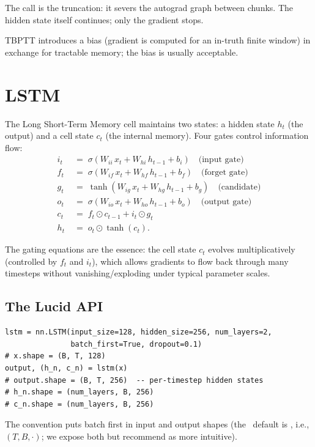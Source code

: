 The  call is the truncation: it severs the
autograd graph between chunks. The hidden state itself
continues; only the gradient stops.

TBPTT introduces a bias (gradient is computed for an in-truth
finite window) in exchange for tractable memory; the bias is
usually acceptable.

\section{LSTM}
\label{sec:rnn_family:lstm}

The Long Short-Term Memory cell maintains two states: a hidden
state $h_t$ (the output) and a cell state $c_t$ (the internal
memory). Four gates control information flow:
\begin{align*}
i_t &\;=\; \sigma(W_{ii}\, x_t + W_{hi}\, h_{t-1} + b_i)
   \quad\text{(input gate)} \\
f_t &\;=\; \sigma(W_{if}\, x_t + W_{hf}\, h_{t-1} + b_f)
   \quad\text{(forget gate)} \\
g_t &\;=\; \tanh(W_{ig}\, x_t + W_{hg}\, h_{t-1} + b_g)
   \quad\text{(candidate)} \\
o_t &\;=\; \sigma(W_{io}\, x_t + W_{ho}\, h_{t-1} + b_o)
   \quad\text{(output gate)} \\
c_t &\;=\; f_t \odot c_{t-1} + i_t \odot g_t \\
h_t &\;=\; o_t \odot \tanh(c_t).
\end{align*}

The gating equations are the essence: the cell state $c_t$ evolves
multiplicatively (controlled by $f_t$ and $i_t$), which allows
gradients to flow back through many timesteps without
vanishing/exploding under typical parameter scales.

\subsection{The Lucid API}
\label{ssec:rnn_family:lstm_api}

\begin{lstlisting}[style=lucid,language=LucidPython]
lstm = nn.LSTM(input_size=128, hidden_size=256, num_layers=2,
               batch_first=True, dropout=0.1)
# x.shape = (B, T, 128)
output, (h_n, c_n) = lstm(x)
# output.shape = (B, T, 256)  -- per-timestep hidden states
# h_n.shape = (num_layers, B, 256)
# c_n.shape = (num_layers, B, 256)
\end{lstlisting}

The  convention puts batch first in input
and output shapes (the \ default is
, i.e., $(T, B, \cdot)$; we expose both
but recommend  as more intuitive).

